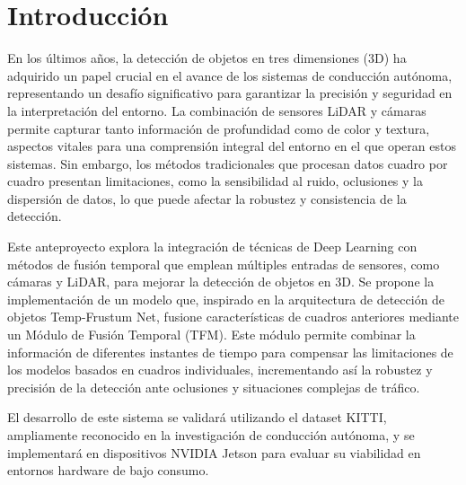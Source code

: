 

\section{Introducción}
\label{sec:introduccion}

En los últimos años, la detección de objetos en tres dimensiones (3D) ha adquirido un papel crucial en el avance de los sistemas de conducción autónoma, representando un desafío significativo para garantizar la precisión y seguridad en la interpretación del entorno. La combinación de sensores LiDAR y cámaras permite capturar tanto información de profundidad como de color y textura, aspectos vitales para una comprensión integral del entorno en el que operan estos sistemas. Sin embargo, los métodos tradicionales que procesan datos cuadro por cuadro presentan limitaciones, como la sensibilidad al ruido, oclusiones y la dispersión de datos, lo que puede afectar la robustez y consistencia de la detección.

Este anteproyecto explora la integración de técnicas de Deep Learning con métodos de fusión temporal que emplean múltiples entradas de sensores, como cámaras y LiDAR, para mejorar la detección de objetos en 3D. Se propone la implementación de un modelo que, inspirado en la arquitectura de detección de objetos Temp-Frustum Net, fusione características de cuadros anteriores mediante un Módulo de Fusión Temporal (TFM). Este módulo permite combinar la información de diferentes instantes de tiempo para compensar las limitaciones de los modelos basados en cuadros individuales, incrementando así la robustez y precisión de la detección ante oclusiones y situaciones complejas de tráfico.

El desarrollo de este sistema se validará utilizando el dataset KITTI, ampliamente reconocido en la investigación de conducción autónoma, y se implementará en dispositivos NVIDIA Jetson para evaluar su viabilidad en entornos hardware de bajo consumo.

